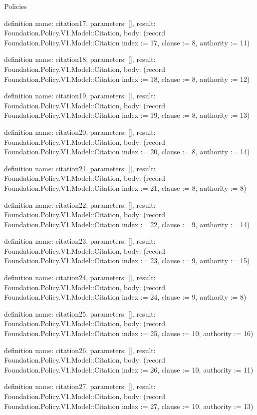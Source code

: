 \begin{lexlean}{Policies}
\begin{semanticmodule}
definition{
  name: citation17,
  parameters: [],
  result: Foundation.Policy.V1.Model::Citation,
  body: (record Foundation.Policy.V1.Model::Citation {index := 17, clause := 8, authority := 11})
}

definition{
  name: citation18,
  parameters: [],
  result: Foundation.Policy.V1.Model::Citation,
  body: (record Foundation.Policy.V1.Model::Citation {index := 18, clause := 8, authority := 12})
}

definition{
  name: citation19,
  parameters: [],
  result: Foundation.Policy.V1.Model::Citation,
  body: (record Foundation.Policy.V1.Model::Citation {index := 19, clause := 8, authority := 13})
}

definition{
  name: citation20,
  parameters: [],
  result: Foundation.Policy.V1.Model::Citation,
  body: (record Foundation.Policy.V1.Model::Citation {index := 20, clause := 8, authority := 14})
}

definition{
  name: citation21,
  parameters: [],
  result: Foundation.Policy.V1.Model::Citation,
  body: (record Foundation.Policy.V1.Model::Citation {index := 21, clause := 8, authority := 8})
}

definition{
  name: citation22,
  parameters: [],
  result: Foundation.Policy.V1.Model::Citation,
  body: (record Foundation.Policy.V1.Model::Citation {index := 22, clause := 9, authority := 14})
}

definition{
  name: citation23,
  parameters: [],
  result: Foundation.Policy.V1.Model::Citation,
  body: (record Foundation.Policy.V1.Model::Citation {index := 23, clause := 9, authority := 15})
}

definition{
  name: citation24,
  parameters: [],
  result: Foundation.Policy.V1.Model::Citation,
  body: (record Foundation.Policy.V1.Model::Citation {index := 24, clause := 9, authority := 8})
}

definition{
  name: citation25,
  parameters: [],
  result: Foundation.Policy.V1.Model::Citation,
  body: (record Foundation.Policy.V1.Model::Citation {index := 25, clause := 10, authority := 16})
}

definition{
  name: citation26,
  parameters: [],
  result: Foundation.Policy.V1.Model::Citation,
  body: (record Foundation.Policy.V1.Model::Citation {index := 26, clause := 10, authority := 11})
}

definition{
  name: citation27,
  parameters: [],
  result: Foundation.Policy.V1.Model::Citation,
  body: (record Foundation.Policy.V1.Model::Citation {index := 27, clause := 10, authority := 13})
}


\end{semanticmodule}
\end{lexlean}
